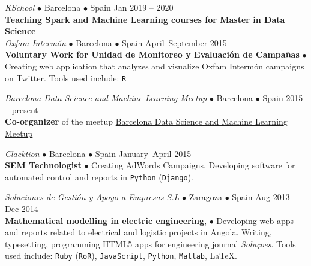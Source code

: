 \documentclass[a4paper, oneside]{scrreprt}
\begin{document}
\vspace{-0.3cm}
\noindent{}\textit{KSchool} $\bullet$ 
Barcelona $\bullet$ Spain \hfill Jan 2019 -- 2020\\
\noindent\textbf{\small Teaching Spark and Machine Learning courses for Master in Data Science} \\

\vspace{-0.3cm}
\noindent{}\textit{Oxfam Intermón} $\bullet$ 
Barcelona $\bullet$ Spain \hfill April--September 2015\\
\noindent\textbf{\small Voluntary Work for Unidad de Monitoreo y Evaluación de Campañas} $\bullet$ 
{\small Creating web application that analyzes and visualize Oxfam Intermón
  campaigns on Twitter.  Tools used
  include: \texttt{R}}\\

\vspace{-0.3cm}

\noindent{}\textit{Barcelona Data Science and Machine Learning Meetup}
$\bullet$ Barcelona $\bullet$ Spain \hfill 2015 -- present\\
\noindent  \textbf{Co-organizer} of the meetup
  \href{https://www.meetup.com/es-ES/barcelona-data-science-machine-learning/}
  {Barcelona Data Science and Machine Learning Meetup}\\


\vspace{-0.3cm}

\noindent{}\textit{Clacktion} $\bullet$ 
Barcelona $\bullet$ Spain \hfill January--April 2015\\
\noindent\textbf{\small SEM Technologist} $\bullet$ Creating AdWords Campaigns.
Developing software for automated control and reports in \texttt{Python} (\texttt{Django}).\\ 

\vspace{-0.3cm}

\noindent{}\textit{Soluciones de Gestión y Apoyo a Empresas S.L} 
$\bullet$ Zaragoza $\bullet$ Spain \hfill Aug 2013--Dec 2014\\
\noindent\textbf{\small Mathematical modelling in electric engineering}, $\bullet$ 
{\small Developing web apps and reports related to electrical and
  logistic projects in Angola.  Writing, typesetting, programming
  HTML5 apps for engineering journal \emph{Soluçoes}.  Tools used
  include:
  \texttt{Ruby} (\texttt{RoR}), \texttt{JavaScript}, \texttt{Python}, \texttt{Matlab}, \LaTeX.}\\
\end{document}
